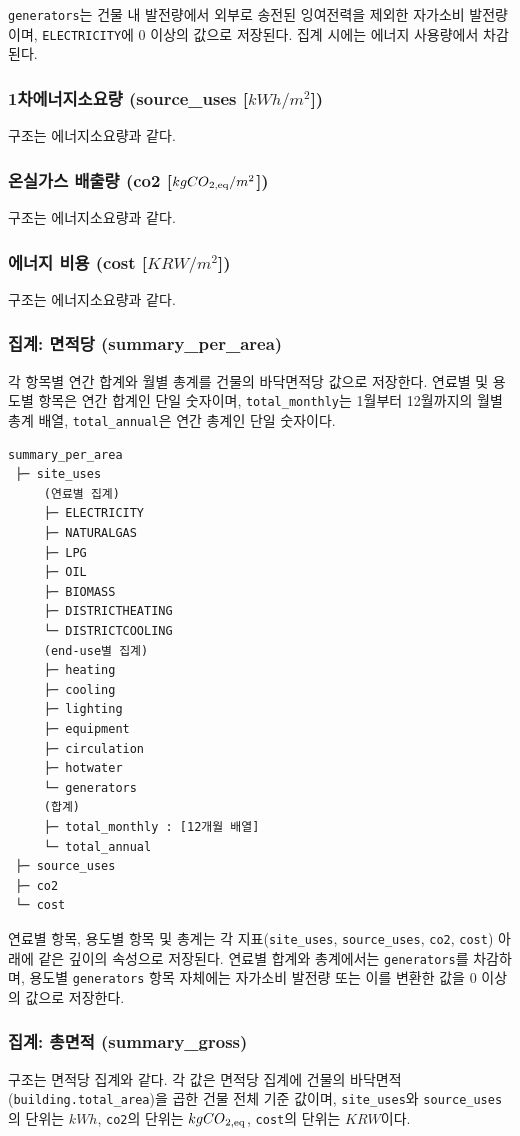 \texttt{generators}는 건물 내 발전량에서 외부로 송전된 잉여전력을 제외한 자가소비 발전량이며, \texttt{ELECTRICITY}에 0 이상의 값으로 저장된다. 집계 시에는 에너지 사용량에서 차감된다.

\subsubsection{1차에너지소요량 (source\_uses [$kWh/m^2$])}
구조는 에너지소요량과 같다.

\subsubsection{온실가스 배출량 (co2 [$kgCO\textsubscript{2,eq}/m^2$])}
구조는 에너지소요량과 같다.

\subsubsection{에너지 비용 (cost [$KRW/m^2$])}
구조는 에너지소요량과 같다.

\subsubsection{집계: 면적당 (summary\_per\_area)}

각 항목별 연간 합계와 월별 총계를 건물의 바닥면적당 값으로 저장한다. 연료별 및 용도별 항목은 연간 합계인 단일 숫자이며, \texttt{total\_monthly}는 1월부터 12월까지의 월별 총계 배열, \texttt{total\_annual}은 연간 총계인 단일 숫자이다.

\begin{verbatim}
summary_per_area
 ├─ site_uses
     (연료별 집계)
     ├─ ELECTRICITY     
     ├─ NATURALGAS      
     ├─ LPG
     ├─ OIL             
     ├─ BIOMASS
     ├─ DISTRICTHEATING
     └─ DISTRICTCOOLING 
     (end-use별 집계)
     ├─ heating     
     ├─ cooling      
     ├─ lighting
     ├─ equipment
     ├─ circulation
     ├─ hotwater
     └─ generators      
     (합계)
     ├─ total_monthly : [12개월 배열]
     └─ total_annual
 ├─ source_uses
 ├─ co2
 └─ cost
\end{verbatim}

연료별 항목, 용도별 항목 및 총계는 각 지표(\texttt{site\_uses}, \texttt{source\_uses}, \texttt{co2}, \texttt{cost}) 아래에 같은 깊이의 속성으로 저장된다. 연료별 합계와 총계에서는 \texttt{generators}를 차감하며, 용도별 \texttt{generators} 항목 자체에는 자가소비 발전량 또는 이를 변환한 값을 0 이상의 값으로 저장한다.

\subsubsection{집계: 총면적 (summary\_gross)}

구조는 면적당 집계와 같다. 각 값은 면적당 집계에 건물의 바닥면적(\texttt{building.total\_area})을 곱한 건물 전체 기준 값이며, \texttt{site\_uses}와 \texttt{source\_uses}의 단위는 $kWh$, \texttt{co2}의 단위는 $kgCO\textsubscript{2,eq}$, \texttt{cost}의 단위는 $KRW$이다.

